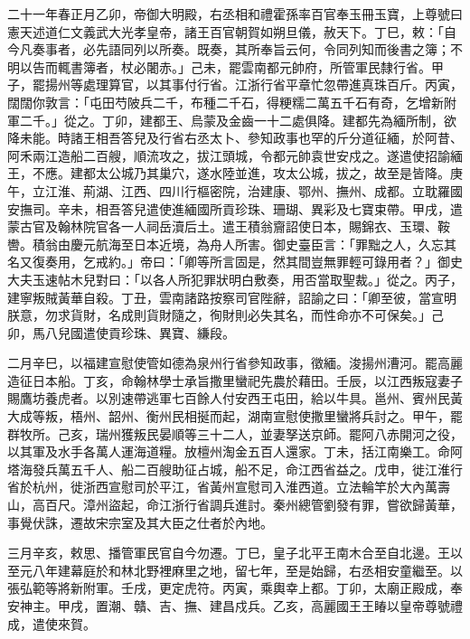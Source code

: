 
\begin{pinyinscope}

 二十一年春正月乙卯，帝御大明殿，右丞相和禮霍孫率百官奉玉冊玉寶，上尊號曰憲天述道仁文義武大光孝皇帝，諸王百官朝賀如朔旦儀，赦天下。丁巳，敕：「自今凡奏事者，必先語同列以所奏。既奏，其所奉旨云何，令同列知而後書之簿；不明以告而輒書簿者，杖必闍赤。」己未，罷雲南都元帥府，所管軍民隸行省。甲子，罷揚州等處理算官，以其事付行省。江浙行省平章忙忽帶進真珠百斤。丙寅，闊闊你敦言：「屯田芍陂兵二千，布種二千石，得粳糯二萬五千石有奇，乞增新附軍二千。」從之。丁卯，建都王、烏蒙及金齒一十二處俱降。建都先為緬所制，欲降未能。時諸王相吾答兒及行省右丞太卜、參知政事也罕的斤分道征緬，於阿昔、阿禾兩江造船二百艘，順流攻之，拔江頭城，令都元帥袁世安戍之。遂遣使招諭緬王，不應。建都太公城乃其巢穴，遂水陸並進，攻太公城，拔之，故至是皆降。庚午，立江淮、荊湖、江西、四川行樞密院，治建康、鄂州、撫州、成都。立耽羅國安撫司。辛未，相吾答兒遣使進緬國所貢珍珠、珊瑚、異彩及七寶束帶。甲戌，遣蒙古官及翰林院官各一人祠岳瀆后土。遣王積翁齎詔使日本，賜錦衣、玉環、鞍轡。積翁由慶元航海至日本近境，為舟人所害。御史臺臣言：「罪黜之人，久忘其名又復奏用，乞戒約。」帝曰：「卿等所言固是，然其間豈無罪輕可錄用者？」御史大夫玉速帖木兒對曰：「以各人所犯罪狀明白敷奏，用否當取聖裁。」從之。丙子，建寧叛賊黃華自殺。丁丑，雲南諸路按察司官陛辭，詔諭之曰：「卿至彼，當宣明朕意，勿求貨財，名成則貨財隨之，徇財則必失其名，而性命亦不可保矣。」己卯，馬八兒國遣使貢珍珠、異寶、縑段。



 二月辛巳，以福建宣慰使管如德為泉州行省參知政事，徵緬。浚揚州漕河。罷高麗造征日本船。丁亥，命翰林學士承旨撒里蠻祀先農於藉田。壬辰，以江西叛寇妻子賜鷹坊養虎者。以別速帶逃軍七百餘人付安西王屯田，給以牛具。邕州、賓州民黃大成等叛，梧州、韶州、衡州民相挻而起，湖南宣慰使撒里蠻將兵討之。甲午，罷群牧所。己亥，瑞州獲叛民晏順等三十二人，並妻孥送京師。罷阿八赤開河之役，以其軍及水手各萬人運海道糧。放檀州淘金五百人還家。丁未，括江南樂工。命阿塔海發兵萬五千人、船二百艘助征占城，船不足，命江西省益之。戊申，徙江淮行省於杭州，徙浙西宣慰司於平江，省黃州宣慰司入淮西道。立法輪竿於大內萬壽山，高百尺。漳州盜起，命江浙行省調兵進討。秦州總管劉發有罪，嘗欲歸黃華，事覺伏誅，遷故宋宗室及其大臣之仕者於內地。



 三月辛亥，敕思、播管軍民官自今勿遷。丁巳，皇子北平王南木合至自北邊。王以至元八年建幕庭於和林北野裡麻里之地，留七年，至是始歸，右丞相安童繼至。以張弘範等將新附軍。壬戌，更定虎符。丙寅，乘輿幸上都。丁卯，太廟正殿成，奉安神主。甲戌，置潮、贛、吉、撫、建昌戍兵。乙亥，高麗國王王睶以皇帝尊號禮成，遣使來賀。




\end{pinyinscope}

